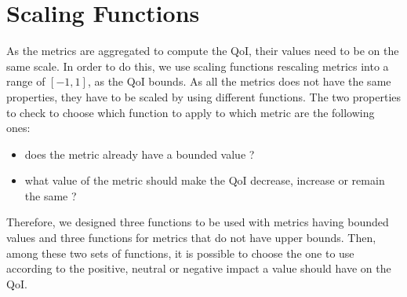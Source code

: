\chapter{Scaling Functions}
\label{annex:functions}
As the metrics are aggregated to compute the QoI, their values need to be on the same scale. In order to do this, we use scaling functions rescaling metrics into a range of $[-1,1]$, as the QoI bounds. As all the metrics does not have the same properties, they have to be scaled by using different functions. The two properties to check to choose which function to apply to which metric are the following ones:
\begin{itemize}
	\item does the metric already have a bounded value ?
	\item what value of the metric should make the QoI decrease, increase or remain the same ?
\end{itemize}
Therefore, we designed three functions to be used with metrics having bounded values and three functions for metrics that do not have upper bounds. Then, among these two sets of functions, it is possible to choose the one to use according to the positive, neutral or negative impact a value should have on the QoI.

